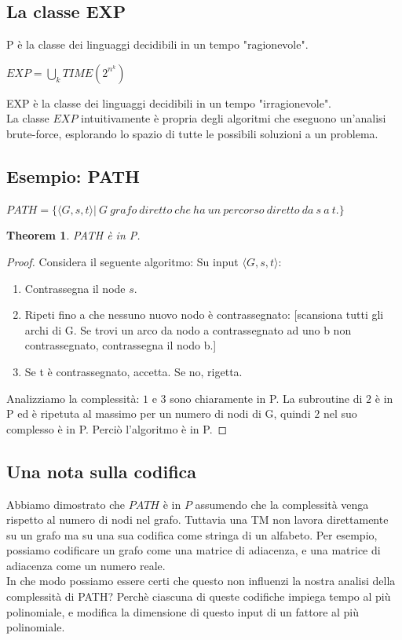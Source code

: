 \documentclass[a4paper, 12pt]{article}
\newtheorem{theorem}{Theorem}[section]
\begin{document}
\subsection{La classe EXP}
P \`e la classe dei linguaggi decidibili in un tempo "ragionevole". \begin{center}
$EXP = \bigcup_{k} TIME(2^{n^{k}})$
\end{center}
EXP \`e la classe dei linguaggi decidibili in un tempo "irragionevole".\\
La classe $EXP$ intuitivamente \`e propria degli algoritmi che eseguono un'analisi brute-force, esplorando lo spazio di tutte le possibili soluzioni a un problema.
\subsection{Esempio: PATH}
$PATH = \{\langle G,s,t \rangle |\ G\ grafo\ diretto\ che\ ha\ un\ percorso\ diretto\ da\ s\ a\ t.\}$

\begin{theorem}
PATH \`e in P.
\end{theorem}
\begin{proof}
Considera il seguente algoritmo: 
Su input $\langle G, s,t \rangle$:

\begin{enumerate}
\item Contrassegna il node $s$.
\item Ripeti fino a che nessuno nuovo nodo \`e contrassegnato: [scansiona tutti gli archi di G. Se trovi un arco da nodo a contrassegnato ad uno b non contrassegnato, contrassegna il nodo b.]
\item Se t \`e contrassegnato, accetta. Se no, rigetta.
\end{enumerate}
Analizziamo la complessit\`a: $1$ e $3$ sono chiaramente in P. La subroutine di $2$ \`e in P ed \`e ripetuta al massimo per un numero di nodi di G, quindi $2$ nel suo complesso \`e in P. Perci\`o l'algoritmo \`e in P.
\end{proof}

\subsection{Una nota sulla codifica}
Abbiamo dimostrato che $PATH$ \`e in $P$ assumendo che la complessit\`a venga rispetto al numero di nodi nel grafo. Tuttavia una TM non lavora direttamente su un grafo ma su una sua codifica come stringa di un alfabeto. Per esempio, possiamo codificare un grafo come una matrice di adiacenza, e una matrice di adiacenza come un numero reale.\\ In che modo possiamo essere certi che questo non influenzi la nostra analisi della complessit\`a di PATH? Perch\`e  ciascuna di queste codifiche impiega tempo al pi\`u polinomiale, e modifica la dimensione di questo input di un fattore al pi\`u polinomiale.
\end{document}
